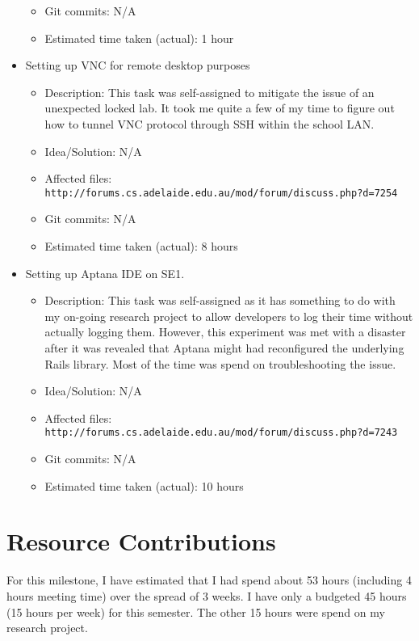 \documentclass{article}
\begin{document}
\begin{itemize}
\begin{itemize}
	         \item Git commits: N/A
	         \item Estimated time taken (actual): 1 hour
	     \end{itemize}
	\item Setting up VNC for remote desktop purposes
	     \begin{itemize}
	         \item Description: This task was self-assigned to mitigate the issue of an unexpected locked lab. It took me quite a few of my time to figure out how to tunnel VNC protocol through SSH within the school LAN.  
	         \item Idea/Solution: N/A
	         \item Affected files: \texttt{http://forums.cs.adelaide.edu.au/mod/forum/discuss.php?d=7254}
	         \item Git commits: N/A
	         \item Estimated time taken (actual): 8 hours
	     \end{itemize}
	\item Setting up Aptana IDE on SE1. 
	      \begin{itemize}
	         \item Description: This task was self-assigned as it has something to do with my on-going research project to allow developers to log their time without actually logging them. However, this experiment was met with a disaster after it was revealed that Aptana might had reconfigured the underlying Rails library. Most of the time was spend on troubleshooting the issue.
	         \item Idea/Solution: N/A
	         \item Affected files: \texttt{http://forums.cs.adelaide.edu.au/mod/forum/discuss.php?d=7243}
	         \item Git commits: N/A
	         \item Estimated time taken (actual): 10 hours
	     \end{itemize}
\end{itemize}

\section*{Resource Contributions}

For this milestone, I have estimated that I had spend about 53 hours (including 4 hours meeting time) over the spread of 3 weeks. I have only a budgeted 45 hours (15 hours per week) for this semester. The other 15 hours were spend on my research project. 
\end{document}
